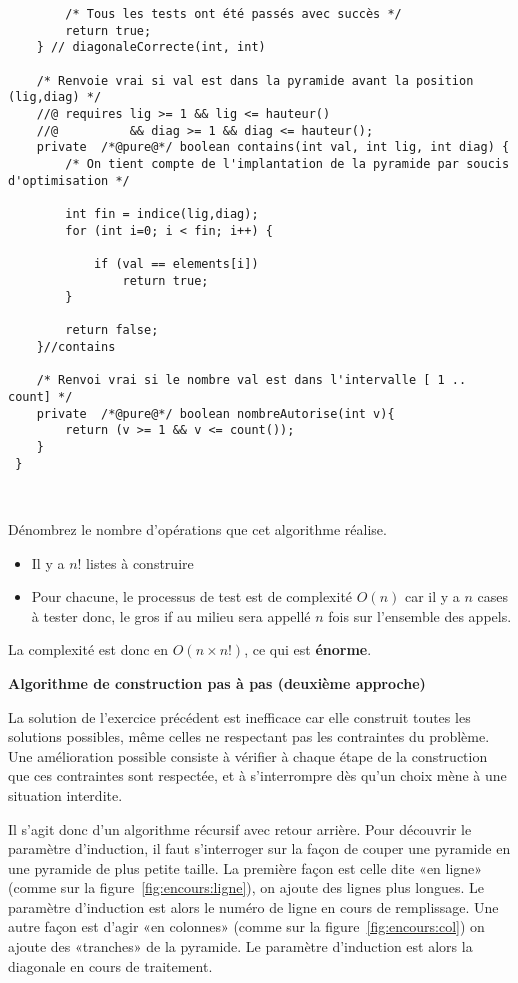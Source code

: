 \documentclass[10pt]{article}\usepackage[correction,nu]{esial}
\begin{document}
\begin{Reponse}
\begin{verbatim}
        /* Tous les tests ont été passés avec succès */
        return true;
    } // diagonaleCorrecte(int, int)

    /* Renvoie vrai si val est dans la pyramide avant la position (lig,diag) */
    //@ requires lig >= 1 && lig <= hauteur() 
    //@          && diag >= 1 && diag <= hauteur();
    private  /*@pure@*/ boolean contains(int val, int lig, int diag) {
        /* On tient compte de l'implantation de la pyramide par soucis d'optimisation */

        int fin = indice(lig,diag);
        for (int i=0; i < fin; i++) {

            if (val == elements[i])
                return true;
        }

        return false;
    }//contains

    /* Renvoi vrai si le nombre val est dans l'intervalle [ 1 .. count] */
    private  /*@pure@*/ boolean nombreAutorise(int v){
        return (v >= 1 && v <= count());
    } 
 }

\end{verbatim}\vspace{-2\baselineskip}~
\end{Reponse}
\begin{Question}
  Dénombrez le nombre d'opérations que cet algorithme réalise.
\end{Question}
\begin{Reponse}
  \begin{itemize}
  \item Il y a $n!$ listes à construire
  \item Pour chacune, le processus de test est de complexité $O(n)$ car il y a
    $n$ cases à tester donc, le gros if au milieu sera appellé $n$ fois sur
    l'ensemble des appels.
  \end{itemize}
  La complexité est donc en $O(n\times n!)$, ce qui est \textbf{énorme}.
\end{Reponse}

\begin{Exercice}\textbf{Algorithme de construction pas à pas (deuxième approche)}

  \noindent La solution de l'exercice précédent est inefficace car elle
  construit toutes les solutions possibles, même celles ne respectant pas les
  contraintes du problème. Une amélioration possible consiste à vérifier à
  chaque étape de la construction que ces contraintes sont respectée, et à
  s'interrompre dès qu'un choix mène à une situation interdite.

  Il s'agit donc d'un algorithme récursif avec retour arrière.  Pour découvrir
  le paramètre d'induction, il faut s'interroger sur la façon de couper une
  pyramide en une pyramide de plus petite taille. La première façon est celle
  dite «en ligne» (comme sur la figure~\ref{fig:encours:ligne}), on ajoute des
  lignes plus longues. Le paramètre d'induction est alors le numéro de ligne en
  cours de remplissage. Une autre façon est d'agir «en colonnes» (comme sur la
  figure~\ref{fig:encours:col}) on ajoute des «tranches» de la pyramide. Le
  paramètre d'induction est alors la diagonale en cours de traitement.
\end{Exercice}
\end{document}
